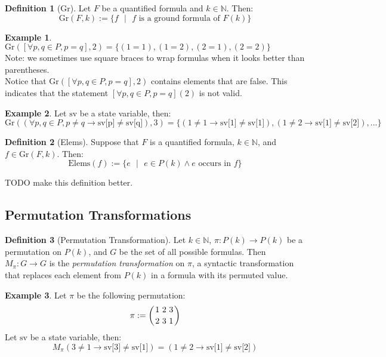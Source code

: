 \documentclass[12pt]{article}
\theoremstyle{definition}
\newtheorem{definition}{Definition}
\newtheorem{example}{Example}
\theoremstyle{remark}
\newcommand{\msp}{\text{ }}
\newcommand{\st}{\text{ }|\text{ }}
\newcommand{\gr}{\text{Gr}}
\newcommand{\elems}{\text{Elems}}
\newcommand{\perm}{\genfrac{}{}{0pt}{}}
\begin{document}
\begin{definition}[Gr]
  Let $F$ be a quantified formula and $k \in \mathbb{N}$.  Then:
  $$\gr(F,k) := \{f \st f \text{ is a ground formula of } F(k)\}$$
\end{definition}

\begin{example}
  $\gr([\forall p,q \in P, p=q],2) = \{(1=1),(1=2),(2=1),(2=2)\}$\\
  Note: we sometimes use square braces to wrap formulas when it looks better than parentheses.\\
  Notice that $\gr([\forall p,q \in P, p=q],2)$ contains elements that are false.  This indicates that the statement $[\forall p,q \in P, p=q](2)$ is not valid.
\end{example}
\begin{example}
  Let $\text{sv}$ be a state variable, then:
  $$\gr((\forall p,q \in P, p \neq q \rightarrow \text{sv[p]} \neq \text{sv[q]}),3) = \{(1 \neq 1 \rightarrow \text{sv[1]} \neq \text{sv[1]}),(1 \neq 2 \rightarrow \text{sv[1]} \neq \text{sv[2]}),...\}$$
\end{example}

\begin{definition}[Elems]
  Suppose that $F$ is a quantified formula, $k \in \mathbb{N}$, and $f \in \gr(F,k)$.  Then:
  $$\elems(f) := \{e \st e \in P(k) \land e \text{ occurs in } f\}$$

  TODO make this definition better.
\end{definition}

\subsection{Permutation Transformations}

\begin{definition}[Permutation Transformation]
  Let $k \in \mathbb{N}$, $\pi : P(k) \to P(k)$ be a permutation on $P(k)$, and $G$ be the set of all possible formulas.  Then $M_\pi : G \to G$ is the \textit{permutation transformation} on $\pi$, a syntactic transformation that replaces each element from $P(k)$ in a formula with its permuted value.
\end{definition}

\begin{example}
  Let $\pi$ be the following permutation:
  $$\pi := \left( \perm{1 \msp 2 \msp 3}{2 \msp 3 \msp 1} \right)$$
  Let $\text{sv}$ be a state variable, then:
  $$M_\pi(3 \neq 1 \rightarrow \text{sv[3]} \neq \text{sv[1]}) = (1 \neq 2 \rightarrow \text{sv[1]} \neq \text{sv[2]})$$
\end{example}
\end{document}
